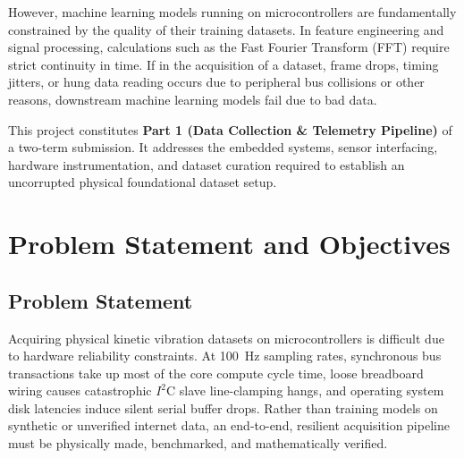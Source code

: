 \documentclass[twocolumn]{article}
\begin{document}
However, machine learning models running on microcontrollers are fundamentally constrained by the quality of their training datasets. In feature engineering and signal processing, calculations such as the Fast Fourier Transform (FFT) require strict continuity in time. If in the acquisition of a dataset, frame drops, timing jitters, or hung data reading occurs due to peripheral bus collisions or other reasons, downstream machine learning models fail due to bad data.

This project constitutes \textbf{Part 1 (Data Collection \& Telemetry Pipeline)} of a two-term submission. It addresses the embedded systems, sensor interfacing, hardware instrumentation, and dataset curation required to establish an uncorrupted physical foundational dataset setup.

\section{Problem Statement and Objectives}

\subsection{Problem Statement}
Acquiring physical kinetic vibration datasets on microcontrollers is difficult due to hardware reliability constraints. At 100~Hz sampling rates, synchronous bus transactions take up most of the core compute cycle time, loose breadboard wiring causes catastrophic $I^2\text{C}$ slave line-clamping hangs, and operating system disk latencies induce silent serial buffer drops. Rather than training models on synthetic or unverified internet data, an end-to-end, resilient acquisition pipeline must be physically made, benchmarked, and mathematically verified.
\end{document}

